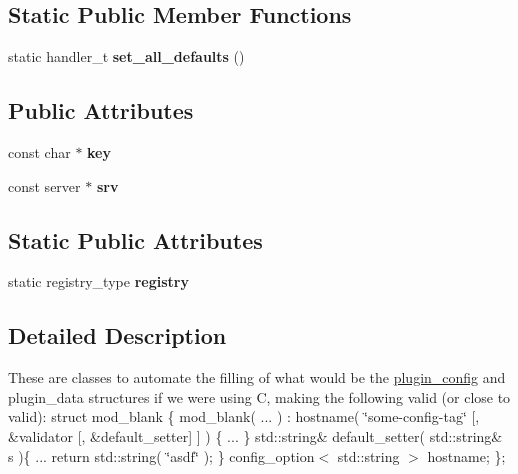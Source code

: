\subsection*{Static Public Member Functions}
\begin{CompactItemize}
\item 
\hypertarget{structconfig__option__base_1a33ba2de88522286bad68735ae9bb0e}{
static handler\_\-t \textbf{set\_\-all\_\-defaults} ()}
\label{structconfig__option__base_1a33ba2de88522286bad68735ae9bb0e}

\end{CompactItemize}
\subsection*{Public Attributes}
\begin{CompactItemize}
\item 
\hypertarget{structconfig__option__base_9e1952a48dc047f2e2152b767e9d0c65}{
const char $\ast$ \textbf{key}}
\label{structconfig__option__base_9e1952a48dc047f2e2152b767e9d0c65}

\item 
\hypertarget{structconfig__option__base_700ece40b8a2feb8f1b8c9196660ade0}{
const server $\ast$ \textbf{srv}}
\label{structconfig__option__base_700ece40b8a2feb8f1b8c9196660ade0}

\end{CompactItemize}
\subsection*{Static Public Attributes}
\begin{CompactItemize}
\item 
\hypertarget{structconfig__option__base_0fcfa3fa7ba3396e7dfb1b9d27970592}{
static registry\_\-type \textbf{registry}}
\label{structconfig__option__base_0fcfa3fa7ba3396e7dfb1b9d27970592}

\end{CompactItemize}


\subsection{Detailed Description}
These are classes to automate the filling of what would be the \hyperlink{structplugin__config}{plugin\_\-config} and plugin\_\-data structures if we were using C, making the following valid (or close to valid): struct mod\_\-blank \{ mod\_\-blank( ... ) : hostname( \char`\"{}some-config-tag\char`\"{} \mbox{[}, \&validator \mbox{[}, \&default\_\-setter\mbox{]} \mbox{]} ) \{ ... \} std::string\& default\_\-setter( std::string\& s )\{ ... return std::string( \char`\"{}asdf\char`\"{} ); \} config\_\-option$<$ std::string $>$ hostname; \};

